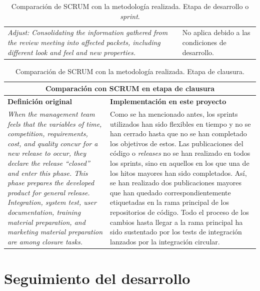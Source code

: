 \begin{table}[]
\begin{tabular}{p{5cm} p{6cm}}
        \textit{Adjust: Consolidating the information gathered from the review meeting into affected packets, including different look and feel and new properties.} & No aplica debido a las condiciones de desarrollo. \\
    \end{tabular}
    \caption{Comparación de SCRUM con la metodología realizada. Etapa de desarrollo o \textit{sprint}.}
    \label{tab:met_desarrollo}
\end{table}

\begin{table}[]
    \centering
    \begin{tabular}{p{5cm} p{6cm}}
        \multicolumn{2}{c}{\textbf{Comparación con SCRUM en etapa de clausura}} \\
        \hline 
        \textbf{Definición original} & \textbf{Implementación en este proyecto} \\ \hline \hline
        
        \textit{When the management team feels that the variables of time, competition, requirements, cost, and quality concur for a new release to occur, they declare the release “closed” and enter this phase. This phase prepares the developed product for general release. Integration, system test, user documentation, training material preparation, and marketing material preparation are among closure tasks.} 
        & 
        Como se ha mencionado antes, los sprints utilizados han sido flexibles en tiempo y no se han cerrado hasta que no se han completado los objetivos de estos. Las publicaciones del código o \textit{releases} no se han realizado en todos los sprints, sino en aquellos en los que una de los hitos mayores han sido completados. Así, se han realizado dos publicaciones mayores que han quedado correspondientemente etiquetadas en la rama principal de los repositorios de código. Todo el proceso de los cambios hasta llegar a la rama principal ha sido sustentado por los tests de integración lanzados por la integración circular. \\ 
    \end{tabular}
    \caption{Comparación de SCRUM con la metodología realizada. Etapa de clausura.}
    \label{tab:met_clausura}
\end{table}

\section{Seguimiento del desarrollo}

